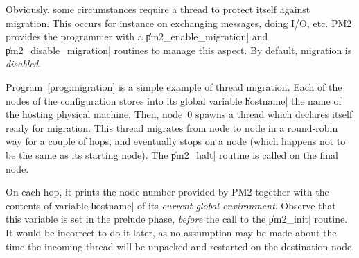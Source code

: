 Obviously, some circumstances require a thread to protect itself
against migration. This occurs for instance on exchanging messages,
doing I/O, etc. PM2 provides the programmer with a
\|pm2_enable_migration| and \|pm2_disable_migration| routines to
manage this aspect. By default, migration is \emph{disabled}.

Program~\ref{prog:migration} is a simple example of thread migration.
Each of the nodes of the configuration stores into its global variable
\|hostname| the name of the hosting physical machine. Then, node~0
spawns a thread which declares itself ready for migration. This thread
migrates from node to node in a round-robin way for a couple of hops,
and eventually stops on a node (which happens not to be the same as
its starting node). The \|pm2_halt| routine is called on the final
node. 

On each hop, it prints the node number provided by PM2 together with
the contents of variable \|hostname| of its \emph{current global
  environment}. Observe that this variable is set in the prelude
phase, \emph{before} the call to the \|pm2_init| routine. It would be
incorrect to do it later, as no assumption may be made about the time
the incoming thread will be unpacked and restarted on the destination
node.

